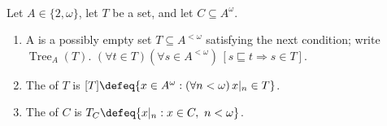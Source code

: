 \begin{definition} \label{def:trees-and-branches-on-countable-alphabets} \\
Let $A\in\{2,\omega\}$, let $T$ be a set, and let $C\subseteq A^\omega$.
\begin{enumerate}[label=(\roman*)]
\setlength{\itemsep}{0pt}
\item A  is a possibly empty set $T\subseteq A^{<\omega}$ satisfying the next condition; write $\operatorname{Tree}_A(T)$. $(\forall t\in T)(\forall s\in A^{<\omega})\,[s\sqsubseteq t\Longrightarrow s\in T]$.
\item The  of $T$ is $[T]\defeq\{x\in A^\omega:(\forall n<\omega)\,x|_n\in T\}$.
\item The  of $C$ is $T_C\defeq\{x|_n:x\in C,\ n<\omega\}$.
\end{enumerate}
\end{definition}

